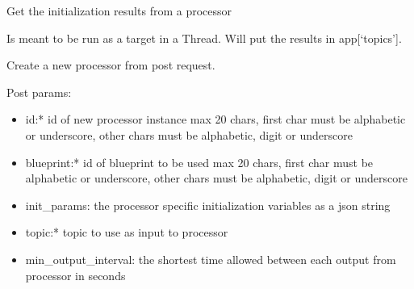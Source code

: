 \documentclass[letterpaper,10pt,english]{sphinxmanual}
\begin{document}

\begin{fulllineitems}
\label{\detokenize{src.processors:src.processors.views.get_initialization_results}}
Get the initialization results from a processor

Is meant to be run as a target in a Thread.
Will put the results in app{[}‘topics’{]}.

\end{fulllineitems}


\begin{fulllineitems}
\label{\detokenize{src.processors:src.processors.views.processor_create}}
Create a new processor from post request.

Post params:
\begin{itemize}
\item {} 
id:* id of new processor instance
max 20 chars, first char must be alphabetic or underscore, other chars must be alphabetic, digit or underscore

\item {} 
blueprint:* id of blueprint to be used
max 20 chars, first char must be alphabetic or underscore, other chars must be alphabetic, digit or underscore

\item {} 
init\_params: the processor specific initialization variables as a json string

\item {} 
topic:* topic to use as input to processor

\item {} 
min\_output\_interval: the shortest time allowed between each output from processor in seconds

\end{itemize}

\end{fulllineitems}
\end{document}
